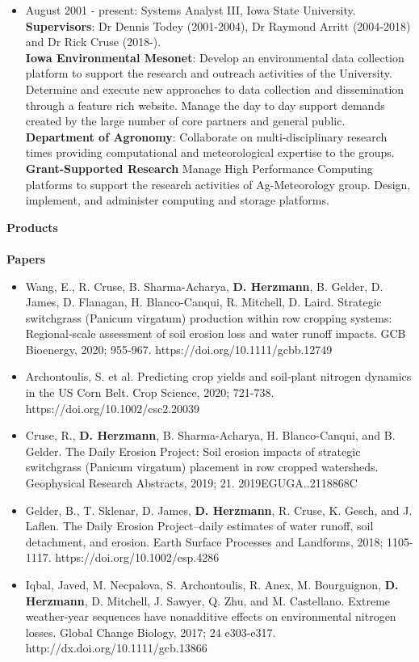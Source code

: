 \begin{itemize}
\item August 2001 - present: Systems Analyst III, Iowa State University.\\
 \textbf{Supervisors}: Dr Dennis Todey (2001-2004), Dr Raymond Arritt (2004-2018) and Dr Rick Cruse (2018-).  \\
\textbf{Iowa Environmental Mesonet}: Develop an environmental data collection
platform to support the research and outreach activities of the University.
Determine and execute new approaches to data collection and dissemination 
through a feature rich website.  Manage the day to day support demands 
created by the large number of core partners and general public. \\
\textbf{Department of Agronomy}: Collaborate on multi-disciplinary research
times providing computational and meteorological expertise to the groups. \\
\textbf{Grant-Supported Research} Manage High Performance Computing platforms
to support the research activities of Ag-Meteorology group.  Design, 
implement, and administer computing and storage platforms.
\end{itemize}
%

\Large \bf Products\\ \\
\normalsize \bf Papers
\normalsize \sf
\begin{itemize}
\item Wang, E., R. Cruse, B. Sharma-Acharya, \textbf{D. Herzmann}, B. Gelder, D. James, D. Flanagan, H. Blanco-Canqui, R. Mitchell, D. Laird. Strategic switchgrass (Panicum virgatum) production within row cropping systems: Regional‐scale assessment of soil erosion loss and water runoff impacts. GCB Bioenergy, 2020; 955-967. https://doi.org/10.1111/gcbb.12749 
\item Archontoulis, S. et al. Predicting crop yields and soil‐plant nitrogen dynamics in the US Corn Belt. Crop Science, 2020; 721-738. https://doi.org/10.1002/csc2.20039
\item Cruse, R., \textbf{D. Herzmann}, B. Sharma-Acharya, H. Blanco-Canqui, and B. Gelder. The Daily Erosion Project: Soil erosion impacts of strategic switchgrass (Panicum virgatum) placement in row cropped watersheds. Geophysical Research Abstracts, 2019; 21. 2019EGUGA..2118868C
\item Gelder, B., T. Sklenar, D. James, \textbf{D. Herzmann}, R. Cruse, K. Gesch, and J. Laflen. The Daily Erosion Project–daily estimates of water runoff, soil detachment, and erosion. Earth Surface Processes and Landforms, 2018; 1105-1117. https://doi.org/10.1002/esp.4286
\item Iqbal, Javed, M. Necpalova, S. Archontoulis, R. Anex, M. Bourguignon, \textbf{D. Herzmann}, D. Mitchell, J. Sawyer, Q. Zhu, and M. Castellano. Extreme weather-year sequences have nonadditive effects on environmental nitrogen losses. Global Change Biology, 2017; 24 e303-e317. http://dx.doi.org/10.1111/gcb.13866
\end{itemize}

